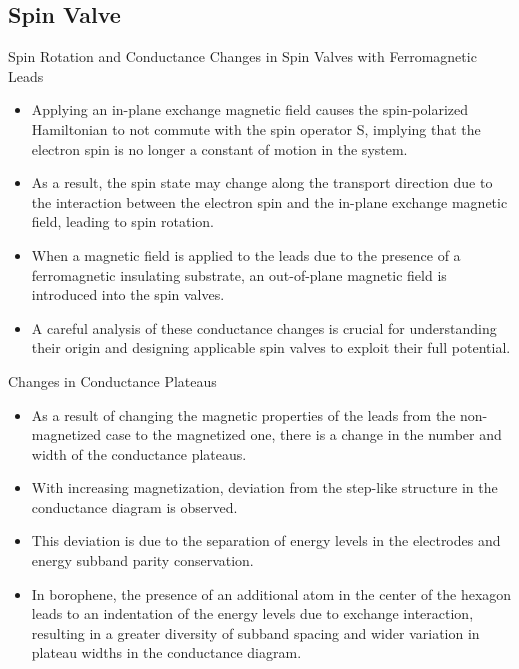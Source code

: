 \documentclass[handout,t]{beamer}
\begin{document}
\subsection{Spin Valve}
\begin{frame}{Spin Rotation and Conductance Changes in Spin Valves with Ferromagnetic Leads}
	\begin{itemize}
		\item Applying an in-plane exchange magnetic field causes the spin-polarized Hamiltonian to not commute with the spin operator S, implying that the electron spin is no longer a constant of motion in the system.
		\item As a result, the spin state may change along the transport direction due to the interaction between the electron spin and the in-plane exchange magnetic field, leading to spin rotation.
		\item When a magnetic field is applied to the leads due to the presence of a ferromagnetic insulating substrate, an out-of-plane magnetic field is introduced into the spin valves.
		\item A careful analysis of these conductance changes is crucial for understanding their origin and designing applicable spin valves to exploit their full potential.
	\end{itemize}
\end{frame}
\begin{frame}{Changes in Conductance Plateaus}
	\begin{itemize}
		\item As a result of changing the magnetic properties of the leads from the non-magnetized case to the magnetized one, there is a change in the number and width of the conductance plateaus.
		\item With increasing magnetization, deviation from the step-like structure in the conductance diagram is observed.
		\item This deviation is due to the separation of energy levels in the electrodes and energy subband parity conservation.
		\item In borophene, the presence of an additional atom in the center of the hexagon leads to an indentation of the energy levels due to exchange interaction, resulting in a greater diversity of subband spacing and wider variation in plateau widths in the conductance diagram.
	\end{itemize}
\end{frame}
\end{document}
